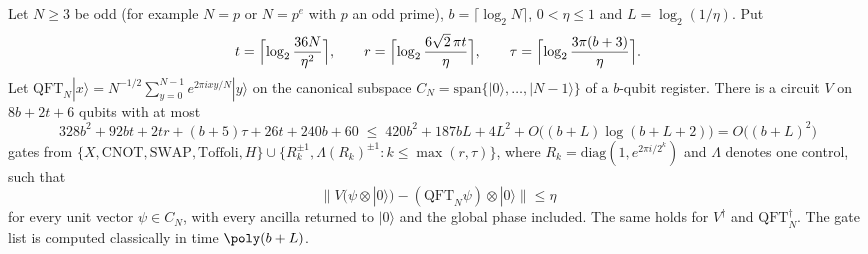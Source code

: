 
\begin{lemma}
\label{lem:qft-mod}
Let $N \ge 3$ be odd (for example $N = p$ or $N = p^e$ with $p$ an odd prime), $b = \lceil\log_2 N\rceil$, $0 < \eta \le 1$ and $L = \log_2(1/\eta)$. Put
\[
  t = \Bigl\lceil \log_2\frac{36N}{\eta^2}\Bigr\rceil,\qquad
  r = \Bigl\lceil \log_2\frac{6\sqrt2\,\pi t}{\eta}\Bigr\rceil,\qquad
  \tau = \Bigl\lceil \log_2\frac{3\pi(b+3)}{\eta}\Bigr\rceil .
\]
Let $\mathrm{QFT}_N|x\rangle = N^{-1/2}\sum_{y=0}^{N-1}e^{2\pi i xy/N}|y\rangle$ on the canonical subspace $C_N = \mathrm{span}\{|0\rangle,\dots,|N-1\rangle\}$ of a $b$-qubit register. There is a circuit $V$ on $8b + 2t + 6$ qubits with at most
\[
  328b^2 + 92bt + 2tr + (b+5)\tau + 26t + 240b + 60 \;\le\; 420b^2 + 187bL + 4L^2 + O\bigl((b+L)\log(b+L+2)\bigr) = O\bigl((b+L)^2\bigr)
\]
gates from $\{X, \mathrm{CNOT}, \mathrm{SWAP}, \mathrm{Toffoli}, H\}\cup\{R_k^{\pm1}, \Lambda(R_k)^{\pm1} : k \le \max(r,\tau)\}$, where $R_k = \mathrm{diag}(1, e^{2\pi i/2^k})$ and $\Lambda$ denotes one control, such that
\[
  \bigl\|V(\psi\otimes|0\rangle) - (\mathrm{QFT}_N\psi)\otimes|0\rangle\bigr\| \le \eta
\]
for every unit vector $\psi \in C_N$, with every ancilla returned to $|0\rangle$ and the global phase included. The same holds for $V^\dagger$ and $\mathrm{QFT}_N^\dagger$. The gate list is computed classically in time $\poly(b + L)$.
\end{lemma}

